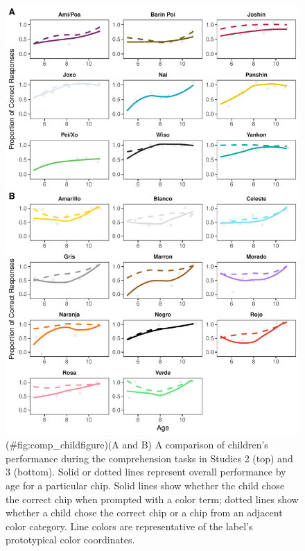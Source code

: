 \documentclass[,man,floatsintext]{apa6}
\theoremstyle{definition}
\theoremstyle{definition}
\theoremstyle{definition}
\theoremstyle{remark}
\begin{document}
\begin{figure}
\centering
\includegraphics{amazon_color_files/figure-latex/comp_childfigure-1.pdf}
\caption{(\#fig:comp\_childfigure)(A and B) A comparison of children's
performance during the comprehension tasks in Studies 2 (top) and 3
(bottom). Solid or dotted lines represent overall performance by age for
a particular chip. Solid lines show whether the child chose the correct
chip when prompted with a color term; dotted lines show whether a child
chose the correct chip or a chip from an adjacent color category. Line
colors are representative of the label's prototypical color
coordinates.}
\end{figure}
\end{document}
